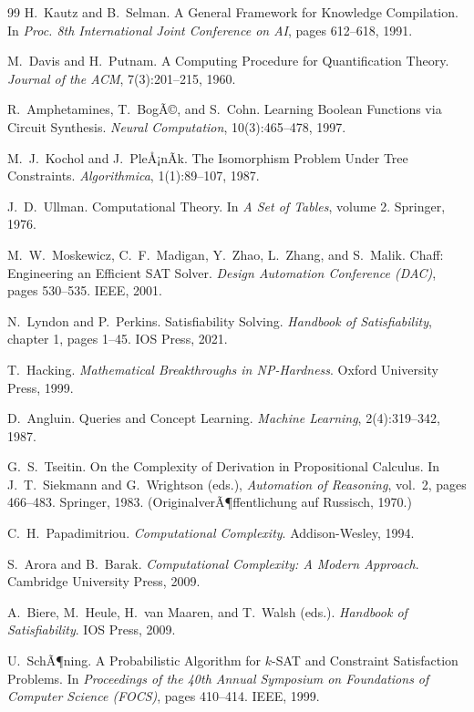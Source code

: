 ﻿\documentclass[a4paper,12pt]{article}
\theoremstyle{definition}
\begin{document}
\begin{thebibliography}{99}
H.\ Kautz and B.\ Selman. A General Framework for Knowledge Compilation. In \textit{Proc. 8th International Joint Conference on AI}, pages 612--618, 1991.

M.\ Davis and H.\ Putnam. A Computing Procedure for Quantification Theory. \textit{Journal of the ACM}, 7(3):201--215, 1960.

R.\ Amphetamines, T.\ BogÃ©, and S.\ Cohn. Learning Boolean Functions via Circuit Synthesis. \textit{Neural Computation}, 10(3):465--478, 1997.

M.\ J.\ Kochol and J.\ PleÅ¡nÃ­k. The Isomorphism Problem Under Tree Constraints. \textit{Algorithmica}, 1(1):89--107, 1987.

J.\ D.\ Ullman. Computational Theory. In \textit{A Set of Tables}, volume 2. Springer, 1976.

M.\ W.\ Moskewicz, C.\ F.\ Madigan, Y.\ Zhao, L.\ Zhang, and S.\ Malik. Chaff: Engineering an Efficient SAT Solver. \textit{Design Automation Conference (DAC)}, pages 530--535. IEEE, 2001.

N.\ Lyndon and P.\ Perkins. Satisfiability Solving. \textit{Handbook of Satisfiability}, chapter 1, pages 1--45. IOS Press, 2021.

T.\ Hacking. \textit{Mathematical Breakthroughs in NP-Hardness}. Oxford University Press, 1999.

D.\ Angluin. Queries and Concept Learning. \textit{Machine Learning}, 2(4):319--342, 1987.

G.\ S.\ Tseitin. On the Complexity of Derivation in Propositional Calculus. In J.\ T.\ Siekmann and G.\ Wrightson (eds.), \textit{Automation of Reasoning}, vol.\ 2, pages 466--483. Springer, 1983. (OriginalverÃ¶ffentlichung auf Russisch, 1970.)

C.\ H.\ Papadimitriou. \textit{Computational Complexity}. Addison-Wesley, 1994.

S.\ Arora and B.\ Barak. \textit{Computational Complexity: A Modern Approach}. Cambridge University Press, 2009.

A.\ Biere, M.\ Heule, H.\ van Maaren, and T.\ Walsh (eds.). \textit{Handbook of Satisfiability}. IOS Press, 2009.

U.\ SchÃ¶ning. A Probabilistic Algorithm for $k$-SAT and Constraint Satisfaction Problems. In \textit{Proceedings of the 40th Annual Symposium on Foundations of Computer Science (FOCS)}, pages 410--414. IEEE, 1999.


\end{thebibliography}
\end{document}
